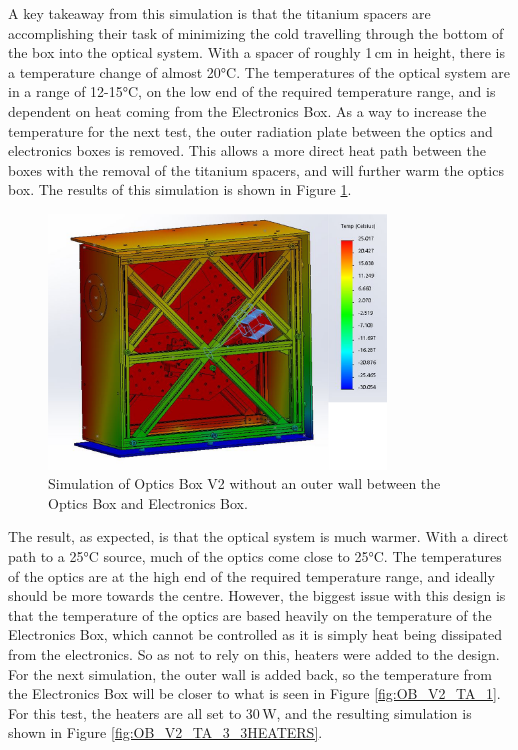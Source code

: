 A key takeaway from this simulation is that the titanium spacers are accomplishing their task of minimizing the cold travelling through the bottom of the box into the optical system. With a spacer of roughly 1\,cm in height, there is a temperature change of almost 20°C. The temperatures of the optical system are in a range of 12-15°C, on the low end of the required temperature range, and is dependent on heat coming from the Electronics Box. As a way to increase the temperature for the next test, the outer radiation plate between the optics and electronics boxes is removed. This allows a more direct heat path between the boxes with the removal of the titanium spacers, and will further warm the optics box. The results of this simulation is shown in Figure \ref{fig:OB_V2_TA_2}.

\begin{figure}
    \centering
    \includegraphics[width=0.8\textwidth]{chap3_images/LIFE_V2_images/TA_25_-30_no_front_left_outer_walls_FIXED.png}
    \caption{Simulation of Optics Box V2 without an outer wall between the Optics Box and Electronics Box.}
    \label{fig:OB_V2_TA_2}
\end{figure}

The result, as expected, is that the optical system is much warmer. With a direct path to a 25°C source, much of the optics come close to 25°C. The temperatures of the optics are at the high end of the required temperature range, and ideally should be more towards the centre. However, the biggest issue with this design is that the temperature of the optics are based heavily on the temperature of the Electronics Box, which cannot be controlled as it is simply heat being dissipated from the electronics. So as not to rely on this, heaters were added to the design. For the next simulation, the outer wall is added back, so the temperature from the Electronics Box will be closer to what is seen in Figure \ref{fig:OB_V2_TA_1}. For this test, the heaters are all set to 30\,W, and the resulting simulation is shown in Figure \ref{fig:OB_V2_TA_3_3HEATERS}.

